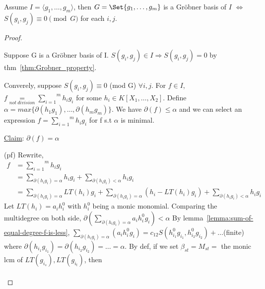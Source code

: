 \begin{theorem}
  Assume $I = \langle g_1, \dots, g_m \rangle$, then
  $G = \Set{g_1, \dots, g_m}$ is a Gr\"{o}bner basis of $I$ $\iff$ $S(g_i, g_j) \equiv 0 \pmod{G}$ for each $i, j$.
  \begin{proof}
    \begin{description} [leftmargin=0cm,labelindent=0cm]
      \item
      \item[$\cdot$] Suppose G is a Gr\"{o}bner basis of I. $S(g_i, g_j) \in I \Rightarrow S(g_i, g_j) = 0$ by thm~\ref{thm:Grobner_property}.
      \item[$\cdot$] Converely, suppose $S(g_i, g_j) \equiv 0$ (mod G) $\forall i, j$. For $f \in I$, $f \underset{not\ division}{=} \overset{m}{\underset{i = 1}{\sum}}h_ig_i$ for some $h_i \in K[X_1,\dots,X_2]$. Define $\alpha = max\{\partial(h_1g_1),\dots,\partial(h_mg_m)\}$. We have $\partial(f) \leq \alpha$ and we can select an expression $f = \overset{m}{\underset{i = 1}{\sum}}h_ig_i$ for f s.t $\alpha$ is minimal.
      \item[] \uline{Claim}:   $\partial(f) = \alpha$
      \item (pf) Rewrite,
          \begin{equation}
            \begin{split}f &= \overset{m}{\underset{i = 1}{\sum}}h_ig_i \\
              &= \underset{\partial(h_ig_i) = \alpha}{\sum}h_ig_i +  \underset{\partial(h_ig_i) < \alpha}{\sum}h_ig_i \\
              &= \underset{\partial(h_ig_i) = \alpha}{\sum}LT(h_i)g_i + \underset{\partial(h_ig_i) = \alpha}{\sum}(h_i-LT(h_i)g_i) + \underset{\partial(h_ig_i) < \alpha}{\sum}{h_ig_i}
            \end{split}
          \end{equation}
          Let $LT(h_i) = a_ih_i^0$ with $h_i^0$ being a monic monomial. Comparing the multidegree on both side, $\partial\left(\underset{\partial(h_ig_i) = \alpha}{\sum}a_ih_i^0g_i\right) < \alpha$ By lemma~\ref{lemma:sum-of-equal-degree-f-is-less}, $\underset{\partial(h_ig_i) = \alpha}{\sum}\left(a_ih_i^0g_i\right) = c_{12}S(h_{i_1}^0g_{i_1},h_{i_2}^0g_{i_2}) + \dots$(finite) where $\partial(h_{i_1}g_{i_1}) = \partial(h_{i_2}g_{i_2}) = \dots = \alpha $. By def, if we set $\beta_{st} = M_{st} =$ the monic lcm of $LT(g_{i_s}), LT(g_{i_t})$, then
          \begin{equation}
            \begin{split}

\end{split}
\end{equation}
\end{description}
\end{proof}
\end{theorem}
